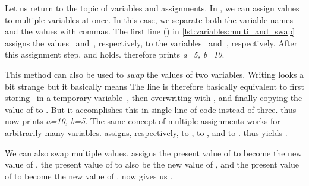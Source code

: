 %
%
%
%
%
Let us return to the topic of variables and assignments.
In \python, we can assign values to multiple variables at once.
In this case, we separate both the variable names and the values with commas.
The first line (\pythonIdx{,}) in \cref{lst:variables:multi_and_swap} assigns the values~ and~, respectively, to the variables~ and~, respectively.
After this assignment step,  and  holds.
 therefore prints \textit{a=5, b=10}.

This method can also be used to \emph{swap} the values of two variables.
Writing  looks a bit strange but it basically means 
The line is therefore basically equivalent to first storing~ in a temporary variable~, then overwriting  with , and finally copying the value of  to .
But it accomplishes this in single line of code instead of three.
 thus now prints \textit{a=10, b=5}.%
%
%
%
The same concept of multiple assignments works for arbitrarily many variables.
 assigns, respectively,  to ,  to , and  to .
 thus yields .

We can also swap multiple values.
 assigns the present value of  to become the new value of , the present value of  to also be the new value of , and the present value of  to become the new value of .
 now gives us .
%
\FloatBarrier%
\endhsection%
%
